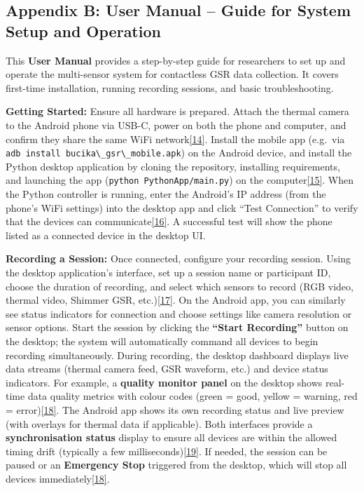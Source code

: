 \documentclass[12pt,a4paper]{article}
\begin{document}
\subsection{Appendix B: User Manual -- Guide for System Setup and Operation}\label{appendix-b-user-manual-guide-for-system-setup-and-operation}

This \textbf{User Manual} provides a step-by-step guide for researchers to set up and operate the multi-sensor system for contactless GSR data collection. It covers first-time installation, running recording sessions, and basic troubleshooting.

\textbf{Getting Started:} Ensure all hardware is prepared. Attach the thermal camera to the Android phone via USB-C, power on both the phone and computer, and confirm they share the same WiFi network\href{docs/QUICK_START.md\#L13-L20}{{[}14{]}}. Install the mobile app (e.g.~via \passthrough{\lstinline!adb install bucika\_gsr\_mobile.apk!}) on the Android device, and install the Python desktop application by cloning the repository, installing requirements, and launching the app (\passthrough{\lstinline!python PythonApp/main.py!}) on the computer\href{docs/QUICK_START.md\#L26-L33}{{[}15{]}}. When the Python controller is running, enter the Android's IP address (from the phone's WiFi settings) into the desktop app and click ``Test Connection'' to verify that the devices can communicate\href{docs/QUICK_START.md\#L36-L44}{{[}16{]}}. A successful test will show the phone listed as a connected device in the desktop UI.

\textbf{Recording a Session:} Once connected, configure your recording session. Using the desktop application's interface, set up a session name or participant ID, choose the duration of recording, and select which sensors to record (RGB video, thermal video, Shimmer GSR, etc.)\href{docs/QUICK_START.md\#L40-L46}{{[}17{]}}. On the Android app, you can similarly see status indicators for connection and choose settings like camera resolution or sensor options. Start the session by clicking the \textbf{``Start Recording''} button on the desktop; the system will automatically command all devices to begin recording simultaneously. During recording, the desktop dashboard displays live data streams (thermal camera feed, GSR waveform, etc.) and device status indicators. For example, a \textbf{quality monitor panel} on the desktop shows real-time data quality metrics with colour codes (green = good, yellow = warning, red = error)\href{docs/thesis_report/Chapter_7_Appendices.md\#L810-L818}{{[}18{]}}. The Android app shows its own recording status and live preview (with overlays for thermal data if applicable). Both interfaces provide a \textbf{synchronisation status} display to ensure all devices are within the allowed timing drift (typically a few milliseconds)\href{docs/thesis_report/Chapter_7_Appendices.md\#L812-L818}{{[}19{]}}. If needed, the session can be paused or an \textbf{Emergency Stop} triggered from the desktop, which will stop all devices immediately\href{docs/thesis_report/Chapter_7_Appendices.md\#L810-L818}{{[}18{]}}.
\end{document}
